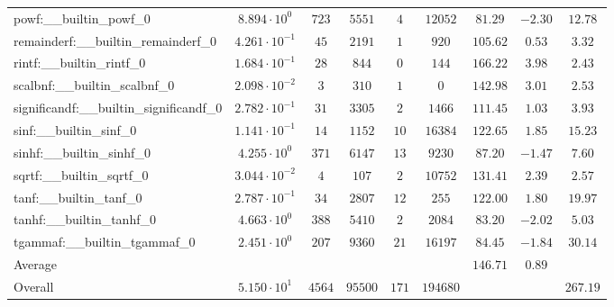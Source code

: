 \begin{tabular}{|l|c|c|c|c|c|c|c|c|}
powf:\_\_builtin\_powf\_0                 & $ 8.894 \cdot 10^{0}  $ & $ 723    $ & $ 5551  $ & $ 4   $ & $ 12052  $ & $ 81.29       $ & $ -2.30   $ & $ 12.78   $ \\
remainderf:\_\_builtin\_remainderf\_0     & $ 4.261 \cdot 10^{-1} $ & $ 45     $ & $ 2191  $ & $ 1   $ & $ 920    $ & $ 105.62      $ & $ 0.53    $ & $ 3.32    $ \\
rintf:\_\_builtin\_rintf\_0               & $ 1.684 \cdot 10^{-1} $ & $ 28     $ & $ 844   $ & $ 0   $ & $ 144    $ & $ 166.22      $ & $ 3.98    $ & $ 2.43    $ \\
scalbnf:\_\_builtin\_scalbnf\_0           & $ 2.098 \cdot 10^{-2} $ & $ 3      $ & $ 310   $ & $ 1   $ & $ 0      $ & $ 142.98      $ & $ 3.01    $ & $ 2.53    $ \\
significandf:\_\_builtin\_significandf\_0 & $ 2.782 \cdot 10^{-1} $ & $ 31     $ & $ 3305  $ & $ 2   $ & $ 1466   $ & $ 111.45      $ & $ 1.03    $ & $ 3.93    $ \\
sinf:\_\_builtin\_sinf\_0                 & $ 1.141 \cdot 10^{-1} $ & $ 14     $ & $ 1152  $ & $ 10  $ & $ 16384  $ & $ 122.65      $ & $ 1.85    $ & $ 15.23   $ \\
sinhf:\_\_builtin\_sinhf\_0               & $ 4.255 \cdot 10^{0}  $ & $ 371    $ & $ 6147  $ & $ 13  $ & $ 9230   $ & $ 87.20       $ & $ -1.47   $ & $ 7.60    $ \\
sqrtf:\_\_builtin\_sqrtf\_0               & $ 3.044 \cdot 10^{-2} $ & $ 4      $ & $ 107   $ & $ 2   $ & $ 10752  $ & $ 131.41      $ & $ 2.39    $ & $ 2.57    $ \\
tanf:\_\_builtin\_tanf\_0                 & $ 2.787 \cdot 10^{-1} $ & $ 34     $ & $ 2807  $ & $ 12  $ & $ 255    $ & $ 122.00      $ & $ 1.80    $ & $ 19.97   $ \\
tanhf:\_\_builtin\_tanhf\_0               & $ 4.663 \cdot 10^{0}  $ & $ 388    $ & $ 5410  $ & $ 2   $ & $ 2084   $ & $ 83.20       $ & $ -2.02   $ & $ 5.03    $ \\
tgammaf:\_\_builtin\_tgammaf\_0           & $ 2.451 \cdot 10^{0}  $ & $ 207    $ & $ 9360  $ & $ 21  $ & $ 16197  $ & $ 84.45       $ & $ -1.84   $ & $ 30.14   $ \\
\hline
Average                                   & $                     $ & $        $ & $       $ & $     $ & $        $ & $ 146.71      $ & $ 0.89    $ & $         $ \\
\hline
Overall                                   & $ 5.150 \cdot 10^{1}  $ & $ 4564   $ & $ 95500 $ & $ 171 $ & $ 194680 $ & $             $ & $         $ & $ 267.19  $ \\
\hline
\end{tabular}
